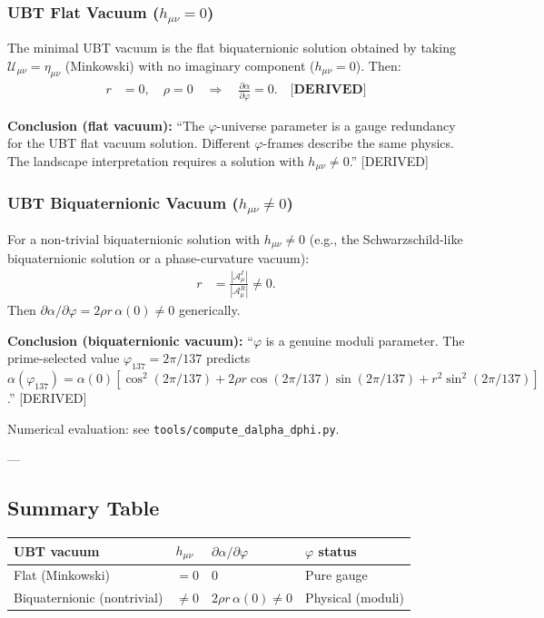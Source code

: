 \subsubsection{UBT Flat Vacuum ($h_{\mu\nu} = 0$)}

The minimal UBT vacuum is the flat biquaternionic solution obtained by taking
$\mathcal{U}_{\mu\nu} = \eta_{\mu\nu}$ (Minkowski) with no imaginary component
($h_{\mu\nu} = 0$). Then:
\begin{align}
  r &= 0, \quad \rho = 0 \quad \Rightarrow \quad
  \frac{\partial\alpha}{\partial\varphi} = 0.  \quad \textbf{[DERIVED]}
\end{align}

\noindent\textbf{Conclusion (flat vacuum):}
``The $\varphi$-universe parameter is a gauge redundancy for the UBT flat vacuum
solution. Different $\varphi$-frames describe the same physics. The landscape
interpretation requires a solution with $h_{\mu\nu} \neq 0$.'' [DERIVED]

\subsubsection{UBT Biquaternionic Vacuum ($h_{\mu\nu} \neq 0$)}

For a non-trivial biquaternionic solution with $h_{\mu\nu} \neq 0$ (e.g., the
Schwarzschild-like biquaternionic solution or a phase-curvature vacuum):
\begin{align}
  r &= \frac{|\mathcal{A}^I_\mu|}{|\mathcal{A}^R_\mu|} \neq 0.
\end{align}
Then $\partial\alpha/\partial\varphi = 2\rho r\,\alpha(0) \neq 0$ generically.

\noindent\textbf{Conclusion (biquaternionic vacuum):}
``$\varphi$ is a genuine moduli parameter. The prime-selected value
$\varphi_{137} = 2\pi/137$ predicts
$\alpha(\varphi_{137}) = \alpha(0)[\cos^2(2\pi/137) + 2\rho r\cos(2\pi/137)\sin(2\pi/137)
+ r^2\sin^2(2\pi/137)]$.'' [DERIVED]

\noindent Numerical evaluation: see \texttt{tools/compute\_dalpha\_dphi.py}.

---

\subsection{Summary Table}
\label{sec:phi_summary}

\begin{center}
\begin{tabular}{|l|l|l|l|}
\hline
\textbf{UBT vacuum} & $h_{\mu\nu}$ & $\partial\alpha/\partial\varphi$ & \textbf{$\varphi$ status} \\
\hline
Flat (Minkowski) & $= 0$ & $0$ & Pure gauge \\
Biquaternionic (nontrivial) & $\neq 0$ & $2\rho r\,\alpha(0) \neq 0$ & Physical (moduli) \\
\hline
\end{tabular}
\end{center}

